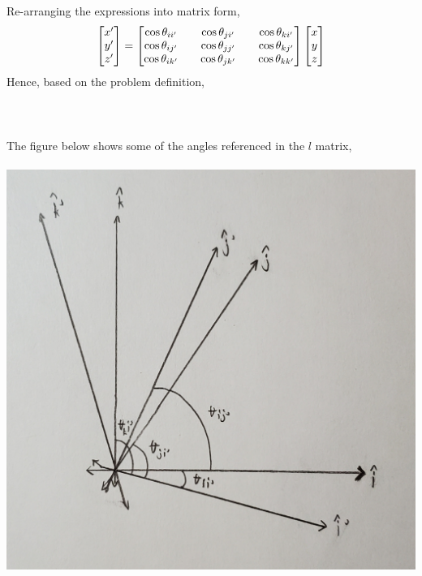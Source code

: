 \documentclass[class=report, 12pt, crop=false]{standalone}
\def\sizes{0.15}
\begin{document}
\begin{center}
Re-arranging the expressions into matrix form,
$$\begin{bmatrix}
x' \\ y' \\ z'
\end{bmatrix} = \begin{bmatrix}
\cos\theta_{ii'} && \cos\theta_{ji'} && \cos\theta_{ki'} \\
\cos\theta_{ij'} && \cos\theta_{jj'} && \cos\theta_{kj'} \\
\cos\theta_{ik'} && \cos\theta_{jk'} && \cos\theta_{kk'}
\end{bmatrix}\begin{bmatrix}
x \\ y \\ z
\end{bmatrix}$$
Hence, based on the problem definition,
\\~\\
\\~\\The figure below shows some of the angles referenced in the $l$ matrix,
\\~\\\includegraphics[scale=\sizes]{Bajing_Terbang}


\end{center}
\end{document}
